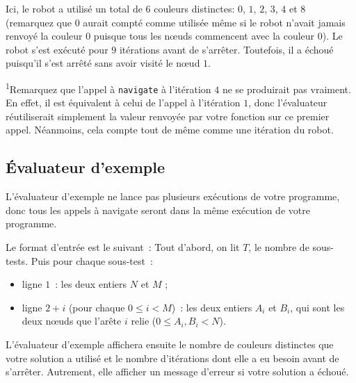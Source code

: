 \documentclass[12pt]{article}
\begin{document}
Ici, le robot a utilisé un total de $6$ couleurs distinctes: $0$, $1$, $2$, $3$, $4$ et $8$ (remarquez que $0$ aurait compté comme utilisée même si le robot n'avait jamais renvoyé la couleur $0$ puisque tous les nœuds commencent avec la couleur $0$). Le robot s'est exécuté pour $9$ itérations avant de s'arrêter. Toutefois, il a échoué puisqu'il s'est arrêté sans avoir visité le nœud $1$.

\textsuperscript{1}Remarquez que l'appel à \texttt{navigate} à l'itération $4$ ne se produirait pas vraiment. En effet, il est équivalent à celui de l'appel à l'itération $1$, donc l'évaluateur réutiliserait simplement la valeur renvoyée par votre fonction sur ce premier appel. Néanmoins, cela compte tout de même comme une itération du robot.

\subsection{Évaluateur d'exemple}

L'évaluateur d'exemple ne lance pas plusieurs exécutions de votre programme, donc tous les appels à navigate seront dans la même exécution de votre programme.

Le format d'entrée est le suivant : Tout d'abord, on lit $T$, le nombre de sous-tests. Puis pour chaque sous-test :
\begin{itemize}
\item ligne $1$ : les deux entiers $N$ et $M$ ;
\item ligne $2+i$ (pour chaque $0 \leq i < M$) : les deux entiers $A_i$ et $B_i$, qui sont les deux nœuds que l'arête $i$ relie ($0 \leq A_i, B_i < N$).
\end{itemize}

L'évaluateur d'exemple affichera ensuite le nombre de couleurs distinctes que votre solution a utilisé et le nombre d'itérations dont elle a eu besoin avant de s'arrêter. Autrement, elle afficher un message d'erreur si votre solution a échoué.
\end{document}
